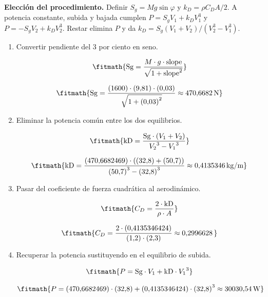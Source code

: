 \noindent\textbf{Elección del procedimiento.} Definir $S_g=Mg\sin\varphi$ y $k_D=\rho C_DA/2$. A potencia constante, subida y bajada cumplen $P=S_gV_1+k_DV_1^3$ y $P=-S_gV_2+k_DV_2^3$. Restar elimina $P$ y da $k_D=S_g(V_1+V_2)/(V_2^3-V_1^3)$.

\begin{enumerate}

\item Convertir pendiente del 3 por ciento en seno.

\[\fitmath{\mathrm{Sg}=\frac{M\cdot g\cdot \mathrm{slope}}{\sqrt{1+{\mathrm{slope}}^{2}}}}\]

\[\fitmath{\mathrm{Sg}=\frac{(1600)\cdot (9{,}81)\cdot (0{,}03)}{\sqrt{1+{(0{,}03)}^{2}}}\approx 470{,}6682\,\mathrm{N}}\]

\item Eliminar la potencia común entre los dos equilibrios.

\[\fitmath{\mathrm{kD}=\frac{\mathrm{Sg}\cdot \left(V_{1}+V_{2}\right)}{{V_{2}}^{3}-{V_{1}}^{3}}}\]

\[\fitmath{\mathrm{kD}=\frac{(470{,}6682469)\cdot \left((32{,}8)+(50{,}7)\right)}{{(50{,}7)}^{3}-{(32{,}8)}^{3}}\approx 0{,}4135346\,\mathrm{kg/m}}\]

\item Pasar del coeficiente de fuerza cuadrática al aerodinámico.

\[\fitmath{C_D=\frac{2\cdot \mathrm{kD}}{\rho\cdot A}}\]

\[\fitmath{C_D=\frac{2\cdot (0{,}4135346424)}{(1{,}2)\cdot (2{,}3)}\approx 0{,}2996628\,}\]

\item Recuperar la potencia sustituyendo en el equilibrio de subida.

\[\fitmath{P=\mathrm{Sg}\cdot V_{1}+\mathrm{kD}\cdot {V_{1}}^{3}}\]

\[\fitmath{P=(470{,}6682469)\cdot (32{,}8)+(0{,}4135346424)\cdot {(32{,}8)}^{3}\approx 30030{,}54\,\mathrm{W}}\]

\end{enumerate}
